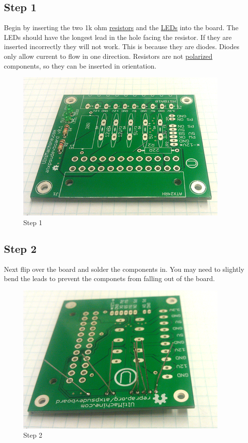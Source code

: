 \subsection{Step 1}

Begin by inserting the two 1k ohm
\href{http://en.wikipedia.org/wiki/Resistors}{resistors} and the
\href{http://en.wikipedia.org/wiki/LED}{LEDs} into the board. The LEDs
should have the longest lead in the hole facing the resistor. If they
are inserted incorrectly they will not work. This is because they are
diodes. Diodes only allow current to flow in one direction. Resistors
are not
\href{http://en.wikipedia.org/wiki/Electrical_polarity}{polarized}
components, so they can be inserted in orientation.

\begin{figure}[H]
\centering
\includegraphics{./png/step-01.png}
\caption{Step 1}
\end{figure}

\subsection{Step 2}

Next flip over the board and solder the components in. You may need to
slightly bend the leads to prevent the componets from falling out of the
board.

\begin{figure}[H]
\centering
\includegraphics{./png/step-02.png}
\caption{Step 2}
\end{figure}

